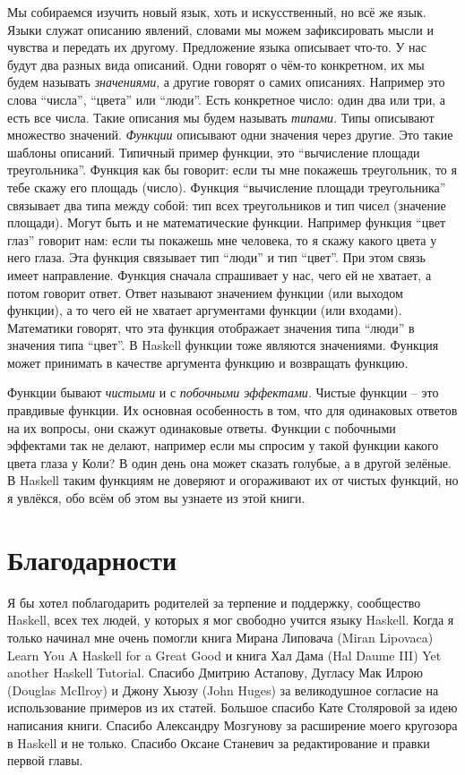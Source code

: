 Мы собираемся изучить новый язык, хоть и искусственный, но всё же язык.
Языки служат описанию явлений, словами мы можем зафиксировать мысли и
чувства и передать их другому. Предложение языка описывает что-то. У нас
будут два разных вида описаний. Одни говорят о чём-то конкретном, их мы
будем называть \emph{значениями}, а другие говорят о самих описаниях.
Например это слова ``числа'', ``цвета'' или ``люди''. Есть конкретное
число: один два или три, а есть все числа. Такие описания мы будем
называть \emph{типами}. Типы описывают множество значений.
\emph{Функции} описывают одни значения через другие. Это такие шаблоны
описаний. Типичный пример функции, это ``вычисление площади
треугольника''. Функция как бы говорит: если ты мне покажешь
треугольник, то я тебе скажу его площадь (число). Функция ``вычисление
площади треугольника'' связывает два типа между собой: тип всех
треугольников и тип чисел (значение площади). Могут быть и не
математические функции. Например функция ``цвет глаз'' говорит нам: если
ты покажешь мне человека, то я скажу какого цвета у него глаза. Эта
функция связывает тип ``люди'' и тип ``цвет''. При этом связь имеет
направление. Функция сначала спрашивает у нас, чего ей не хватает, а
потом говорит ответ. Ответ называют значением функции (или выходом
функции), а то чего ей не хватает аргументами функции (или входами).
Математики говорят, что эта функция отображает значения типа ``люди'' в
значения типа ``цвет''. В Haskell функции тоже являются значениями.
Функция может принимать в качестве аргумента функцию и возвращать
функцию.

Функции бывают \emph{чистыми} и с \emph{побочными эффектами}. Чистые
функции -- это правдивые функции. Их основная особенность в том, что для
одинаковых ответов на их вопросы, они скажут одинаковые ответы. Функции
с побочными эффектами так не делают, например если мы спросим у такой
функции какого цвета глаза у Коли? В один день она может сказать
голубые, а в другой зелёные. В Haskell таким функциям не доверяют и
огораживают их от чистых функций, но я увлёкся, обо всём об этом вы
узнаете из этой книги.

\section{Благодарности}

Я бы хотел поблагодарить родителей за терпение и поддержку, сообщество
Haskell, всех тех людей, у которых я мог свободно учится языку Haskell.
Когда я только начинал мне очень помогли книга Мирана Липовача (Miran
Lipovaca) Learn You A Haskell for a Great Good и книга Хал Дама (Hal
Daume III) Yet another Haskell Tutorial. Спасибо Дмитрию Астапову,
Дугласу Мак Илрою (Douglas McIlroy) и Джону Хьюзу (John Huges) за
великодушное согласие на использование примеров из их статей. Большое
спасибо Кате Столяровой за идею написания книги. Спасибо Александру
Мозгунову за расширение моего кругозора в Haskell и не только. Спасибо
Оксане Станевич за редактирование и правки первой главы.

